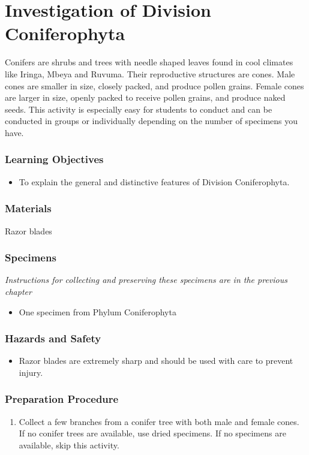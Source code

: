 \section{Investigation of Division Coniferophyta}
Conifers are shrubs and trees with needle shaped leaves found in cool climates like Iringa, Mbeya and Ruvuma. Their reproductive structures are cones. Male cones are smaller in size, closely packed, and produce pollen grains. Female cones are larger in size, openly packed to receive pollen grains, and produce naked seeds. This activity is especially easy for students to conduct and can be conducted in groups or individually depending on the number of specimens you have.

\subsubsection*{Learning Objectives}
\begin{itemize}
\item{To explain the general and distinctive features of Division Coniferophyta.}
\end{itemize}

\subsubsection*{Materials}
Razor blades

\subsubsection*{Specimens}
\textit{Instructions for collecting and preserving these specimens are in the previous chapter}
\begin{itemize}
\item{One specimen from Phylum Coniferophyta}
\end{itemize}

\subsubsection*{Hazards and Safety}
\begin{itemize}
\item{Razor blades are extremely sharp and should be used with care to prevent injury.}
\end{itemize}

\subsubsection*{Preparation Procedure}
\begin{enumerate}
\item{Collect a few branches from a conifer tree with both male and female cones. If no conifer trees are available, use dried specimens. If no specimens are available, skip this activity.}
\end{enumerate}

